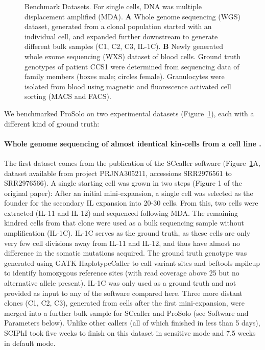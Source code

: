 \documentclass[12pt,inline]{wlscirep}
\begin{document}
\begin{figure}[!tpb]
\begin{minipage}{.22\linewidth}
  \end{minipage}
  \caption{
   Benchmark Datasets.
   For single cells, DNA was multiple displacement amplified (MDA).
   \textbf{A} Whole genome sequencing (WGS) dataset, generated from a clonal population started with an individual cell\cite{dong_accurate_2017}, and expanded further downstream to generate different bulk samples (C1, C2, C3, IL-1C).
   \textbf{B} Newly generated whole exome sequencing (WXS) dataset of blood cells.
   Ground truth genotypes of patient CCS1 were determined from sequencing data of family members (boxes male; circles female).
   Granulocytes were isolated from blood using magnetic and fluorescence activated cell sorting (MACS and FACS).
   }
  \label{fig:datasets}
\end{figure}

We benchmarked ProSolo on two experimental datasets (Figure~\ref{fig:datasets}), each with a different kind of ground truth:\\

\paragraph{Whole genome sequencing of almost identical kin-cells from a cell line \cite{dong_accurate_2017}.}
The first dataset comes from the publication of the SCcaller software\cite{dong_accurate_2017} (Figure~\ref{fig:datasets}A, dataset available from project \mbox{PRJNA305211}, accessions \mbox{SRR2976561} to \mbox{SRR2976566}).
A single starting cell was grown in two steps (Figure 1 of the original paper\cite{dong_accurate_2017}):
After an initial mini-expansion, a single cell was selected as the founder for the secondary IL expansion into 20-30 cells.
From this, two cells were extracted (IL-11 and IL-12) and sequenced following MDA.
The remaining kindred cells from that clone were used as a bulk sequencing sample without amplification (IL-1C).
IL-1C serves as the ground truth, as these cells are only very few cell divisions away from IL-11 and IL-12, and thus have almost no difference in the somatic mutations acquired.
The ground truth genotype was generated using GATK HaplotypeCaller to call variant sites and bcftools mpileup to identify homozygous reference sites (with read coverage above 25 but no alternative allele present).
IL-1C was only used as a ground truth and not provided as input to any of the software compared here.
Three more distant clones (C1, C2, C3), generated from cells after the first mini-expansion, were merged into a further bulk sample for SCcaller and ProSolo (see Software and Parameters below).
Unlike other callers (all of which finished in less than 5 days), SCIPhI took five weeks to finish on this dataset in sensitive mode and 7.5 weeks in default mode.\\
\end{document}
